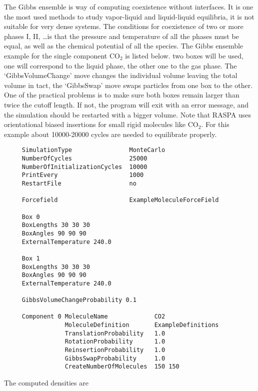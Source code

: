 The Gibbs ensemble is way of computing coexistence without interfaces. It is one the most used methods
to study vapor-liquid and liquid-liquid equilibria, it is not suitable for very dense systems. The
conditions for coexistence of two or more phases I, II, \dots is that the pressure and temperature
of all the phases must be equal, as well as the chemical potential of all the species. The Gibbs
ensemble example for the single component CO$_2$ is listed below. two boxes will be used, one will
correspond to the liquid phase, the other one to the gas phase. The `GibbsVolumeChange' move
changes the individual volume leaving the total volume in tact, the `GibbsSwap' move
swaps particles from one box to the other. One of the practical problems is to make sure both
boxes remain larger than twice the cutoff length. If not, the program will exit with an error message,
and the simulation should be restarted with a bigger volume.
Note that RASPA uses orientational biased insertions for small rigid molecules like CO$_2$.
For this example about 10000-20000 cycles are needed to equilibrate properly.
\begin{tiny}
\begin{verbatim}
     SimulationType                MonteCarlo
     NumberOfCycles                25000
     NumberOfInitializationCycles  10000
     PrintEvery                    1000
     RestartFile                   no

     Forcefield                    ExampleMoleculeForceField

     Box 0
     BoxLengths 30 30 30
     BoxAngles 90 90 90
     ExternalTemperature 240.0

     Box 1
     BoxLengths 30 30 30
     BoxAngles 90 90 90
     ExternalTemperature 240.0

     GibbsVolumeChangeProbability 0.1

     Component 0 MoleculeName             CO2
                 MoleculeDefinition       ExampleDefinitions
                 TranslationProbability   1.0
                 RotationProbability      1.0
                 ReinsertionProbability   1.0
                 GibbsSwapProbability     1.0
                 CreateNumberOfMolecules  150 150
\end{verbatim}
\end{tiny}
The computed densities are

